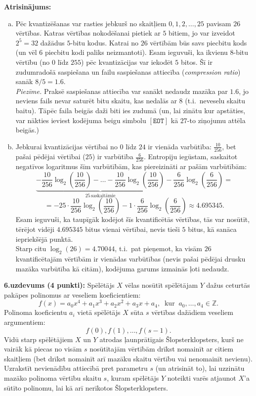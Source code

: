 \documentclass[11pt]{article}
\begin{document}
\vspace{6pt}
{\bf Atrisinājums:}
\begin{enumerate}[(a)]
\item Pēc kvantizēšanas var rasties jebkurš no skaitļiem $0,1,2,\ldots,25$ \textendash{} pavisam $26$ vērtības.
Katras vērtības nokodēšanai pietiek ar $5$ bitiem, jo var izveidot $2^{5} = 32$ dažādus $5$-bitu kodus.
Katrai no $26$ vērtībām būs savs piecbitu kods (un vēl $6$ piecbitu kodi paliks neizmantoti).
Esam ieguvuši, ka ikvienu $8$-bitu vērtību (no $0$ līdz $255$) pēc kvantizācijas var iekodēt $5$ bitos.
Šī ir zudumradošā saspiešana un failu saspiešanas attiecība ({\em compression ratio}) sanāk $8/5 = 1.6$.\\
{\em Piezīme.} Praksē saspiešanas attiecība var sanākt nedaudz mazāka par $1.6$, jo neviens fails nevar
saturēt bitu skaitu, kas nedalās ar $8$ (t.i.\ neveselu skaitu baitu).
Tāpēc faila beigās daži biti ies zudumā (un, lai zinātu kur apstāties,
var nākties ieviest kodējuma beigu simbolu $\mathtt{[EOT]}$ kā $27$-to ziņojumu attēla beigās.)
\item Jebkurai kvantizācijas vērtībai no $0$ līdz $24$ ir vienāda varbūtība: $\frac{10}{256}$, bet
pašai pēdējai vērtībai ($25$) ir varbūtība $\frac{6}{256}$. Entropiju iegūstam, saskaitot
negatīvos logaritmus šīm varbūtībām, kas piereizināti ar pašām varbūtībām:
$$ \underbrace{-\frac{10}{256}\log_2\left( \frac{10}{256} \right) - \ldots - \frac{10}{256}\log_2\left( \frac{10}{256} \right)}_{25\,\text{saskaitāmie}} - \frac{6}{256}\log_2\left( \frac{6}{256} \right) = $$
$$ = -25\cdot \frac{10}{256}\log_2\left( \frac{10}{256} \right) - 1 \cdot \frac{6}{256}\log_2\left( \frac{6}{256} \right) \approx 4.695345.$$
Esam ieguvuši, ka taupīgāk kodējot šīs kvantificētās vērtības, tās var nosūtīt, tērējot vidēji $4.695345$ bitus vienai vērtībai,
nevis tieši $5$ bitus, kā sanāca iepriekšējā punktā.\\
Starp citu $\log_2(26) = 4.70044$, t.i.\ pat pieņemot, ka visām $26$ kvantificētajām vērtībām ir vienādas varbūtības (nevis pašai
pēdējai drusku mazāka varbūtība kā citām), kodējuma garums izmainās ļoti nedaudz.
\end{enumerate}



{\footnotesize
\vspace{6pt}
{\bf 6.uzdevums (4 punkti):}
Spēlētājs $X$ vēlas nosūtīt spēlētājam $Y$ dažus ceturtās pakāpes polinomus ar veseliem koeficientiem:
$$f(x) = a_0x^4 + a_1x^3 + a_2x^2 + a_3x + a_4,\;\;\text{kur}\;\;a_0,\ldots,a_4 \in \mathbb{Z}.$$
Polinoma koeficientu $a_i$ vietā spēlētājs $X$ sūta $s$ vērtības dažādiem veseliem argumentiem:
$$f(0),f(1),\ldots,f(s-1).$$
Vidū starp spēlētājiem $X$ un $Y$ atrodas ļaunprātīgais Šlopsterklopsters, kurš ne vairāk kā piecas
no visām $s$ nosūtītajām vērtībām drīkst nomainīt ar citiem skaitļiem (bet drīkst nomainīt arī mazāku skaitu
vērtību vai nenomainīt nevienu).\\
Uzrakstīt nevienādību attiecībā pret parametru $s$ (un atrisināt to), lai uzzinātu mazāko polinoma vērtību skaitu $s$, kuram
spēlētājs $Y$ noteikti varēs atjaunot $X$'a sūtīto polinomu, lai kā arī nerīkotos Šlopsterklopsters.
}
\end{document}
